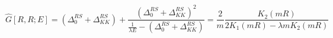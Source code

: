 \begin{equation}
\label{fixed-e5}
\hat{G}[R, R; E] = (\Delta_0^{RS} + \Delta_{KK}^{RS}) + 
\frac{(\Delta_0^{RS} + \Delta_{KK}^{RS})^2}
     {\frac{1}{\lambda E} - (\Delta_0^{RS} + \Delta_{KK}^{RS})}
=
\frac{2}{m} 
\frac{K_2(m R)}{2 K_1(m R) - \lambda m K_2(m R)}
\end{equation}

